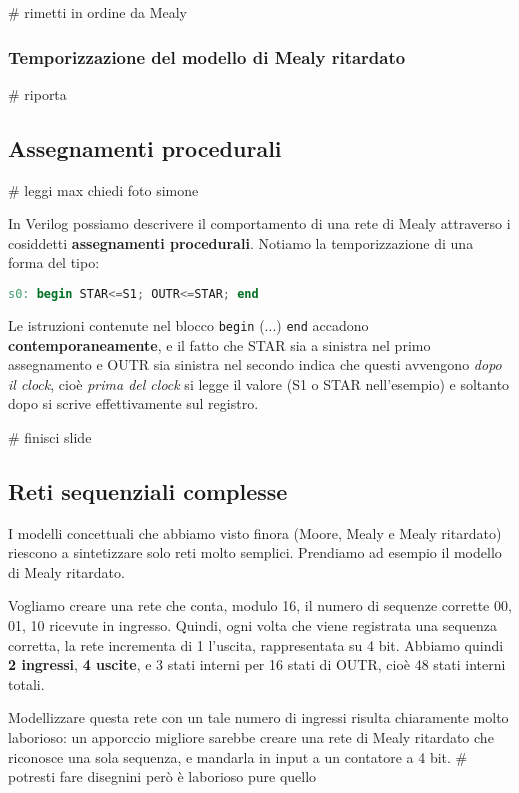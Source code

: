 \documentclass[a4paper,11pt]{article}
\begin{document}
# rimetti in ordine da Mealy

\subsubsection{Temporizzazione del modello di Mealy ritardato}
# riporta

\subsection{Assegnamenti procedurali}
# leggi max chiedi foto simone

In Verilog possiamo descrivere il comportamento di una rete di Mealy attraverso i cosiddetti \textbf{assegnamenti procedurali}.
Notiamo la temporizzazione di una forma del tipo:
\begin{lstlisting}[language=verilog, style=codestyle]	
s0: begin STAR<=S1; OUTR<=STAR; end
\end{lstlisting}
Le istruzioni contenute nel blocco \lstinline|begin| (...) \lstinline|end| accadono \textbf{contemporaneamente}, e il fatto che STAR sia a sinistra nel primo assegnamento e OUTR sia sinistra nel secondo indica che questi avvengono \textit{dopo il clock}, cioè \textit{prima del clock} si legge il valore (S1 o STAR nell'esempio) e soltanto dopo si scrive effettivamente sul registro.

# finisci slide


\subsection{Reti sequenziali complesse}
I modelli concettuali che abbiamo visto finora (Moore, Mealy e Mealy ritardato) riescono a sintetizzare solo reti molto semplici.
Prendiamo ad esempio il modello di Mealy ritardato.

Vogliamo creare una rete che conta, modulo 16, il numero di sequenze corrette 00, 01, 10 ricevute in ingresso.
Quindi, ogni volta che viene registrata una sequenza corretta, la rete incrementa di 1 l'uscita, rappresentata su 4 bit.
Abbiamo quindi \textbf{2 ingressi}, \textbf{4 uscite}, e 3 stati interni per 16 stati di OUTR, cioè 48 stati interni totali.

Modellizzare questa rete con un tale numero di ingressi risulta chiaramente molto laborioso: un apporccio migliore sarebbe creare una rete di Mealy ritardato che riconosce una sola sequenza, e mandarla in input a un contatore a 4 bit.
# potresti fare disegnini però è laborioso pure quello
\end{document}
